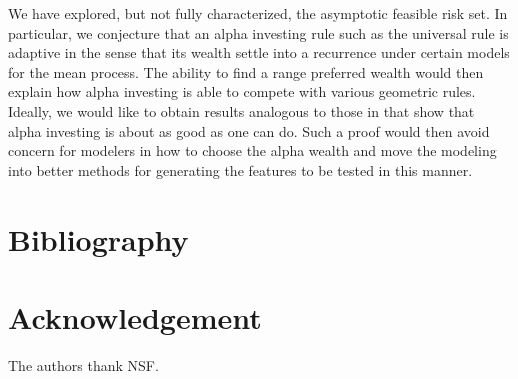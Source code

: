 \documentclass[12pt]{article}
\begin{document}
 
 We have explored, but not fully characterized, the asymptotic feasible risk
 set.  In particular, we conjecture that an alpha investing rule such as the
 universal rule is adaptive in the sense that its wealth settle into a
 recurrence under certain models for the mean process.  The ability to find a
 range preferred wealth would then explain how alpha investing is able to
 compete with various geometric rules.  Ideally, we would like to obtain results
 analogous to those in \citet{rissanen83} that show that alpha investing is
 about as good as one can do.  Such a proof would then avoid concern for
 modelers in how to choose the alpha wealth and move the modeling into better
 methods for generating the features to be tested in this manner.


\section{ Bibliography }
\section*{Acknowledgement}

The authors thank NSF.





\end{document}
